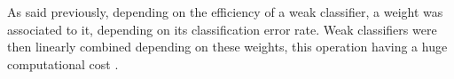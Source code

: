 \noindent As said previously, depending on the efficiency of a weak classifier, a weight was associated to it, depending on its classification error rate. Weak classifiers were then linearly combined depending on these weights, this operation having a huge computational cost \cite{DIN08}.
\newline






